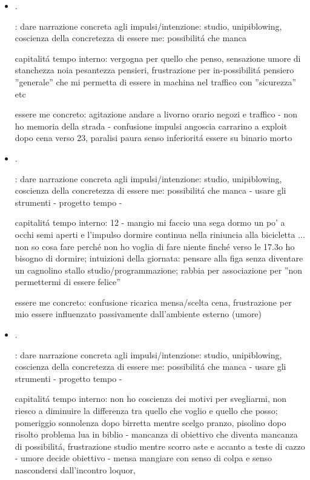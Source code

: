 \begin{itemize}
essere me concreto: confusione sonno, confusione affanno corsa confusione fatica doccia post workout e confusione birra e pizza con caf\'e a matematica: perch\'e la concretezza diventa confusione?

\item {}.

: dare narrazione concreta agli impulsi/intenzione: studio, unipiblowing, coscienza della concretezza di essere me: possibilit\'a che manca

capitalit\'a tempo interno: vergogna per quello che penso, sensazione umore di stanchezza noia pesantezza pensieri, frustrazione per in-possibilit\'a pensiero ''generale'' che mi permetta di essere in machina nel traffico con ''sicurezza'' etc

essere me concreto: agitazione andare a livorno orario negozi e traffico - non ho memoria della strada - confusione impulsi angoscia carrarino a exploit dopo cena verso 23, paralisi paura senso inferiorit\'a essere su binario morto

\item {}.

: dare narrazione concreta agli impulsi/intenzione: studio, unipiblowing, coscienza della concretezza di essere me: possibilit\'a che manca - usare gli strumenti - progetto tempo -

capitalit\'a tempo interno: 12 - mangio mi faccio  una sega dormo un po' a occhi semi aperti e l'impulso dormire continua nella riniuncia alla bicicletta ...
non so cosa fare perch\'e non ho voglia di fare niente finch\'e verso le 17.3o ho bisogno di dormire; intuizioni della giornata: pensare alla figa senza diventare un cagnolino
stallo studio/programmazione; rabbia per associazione per ''non permettermi di essere felice''

essere me concreto: confusione ricarica mensa/scelta cena, frustrazione per mio essere influenzato passivamente dall'ambiente esterno (umore)

\item {}.

: dare narrazione concreta agli impulsi/intenzione: studio, unipiblowing, coscienza della concretezza di essere me: possibilit\'a che manca - usare gli strumenti - progetto tempo -

capitalit\'a tempo interno: non ho coscienza dei motivi per svegliarmi, non riesco a diminuire la differenza tra quello che voglio e quello che posso; pomeriggio sonnolenza dopo birretta mentre scelgo pranzo, pisolino dopo risolto problema lua in biblio - mancanza di obiettivo che diventa mancanza di possibilit\'a, frustrazione studio mentre scorro aste e accanto a teste di cazzo - umore decide obiettivo - mensa mangiare con senso di colpa e senso nascondersi dall'incontro loquor, 


\end{itemize}
